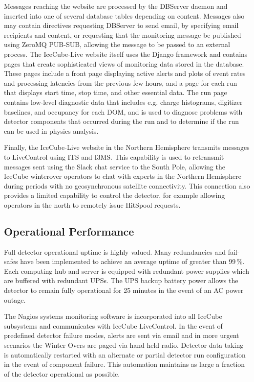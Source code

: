 Messages reaching the website are processed by the DBServer daemon and inserted into one of several database tables depending on content.
Messages also may contain directives requesting DBServer to send email, by specifying email recipients and content,
or requesting that the monitoring message be published using ZeroMQ PUB-SUB, allowing the message to be passed to an external process.  The IceCube-Live
website itself uses the Django framework and contains pages that create sophisticated views of monitoring data stored in the database.
These pages include a front page displaying active alerts and plots of event rates and processing latencies from the previous few hours, and
a page for each run that displays start time, stop time, and other essential data.  The run page contains low-level diagnostic data that
includes e.g. charge histograms, digitizer baselines, and occupancy for each DOM, and is used to diagnose problems with detector components
that occurred during the run and to determine if the run can be used in physics analysis.

Finally, the IceCube-Live website in the Northern Hemisphere transmits messages to LiveControl using ITS and I3MS.  This capability is used to retransmit
messages sent using the Slack chat service to the South Pole, allowing the IceCube winterover operators to chat with
experts in the Northern Hemisphere during periods with no geosynchronous satellite connectivity.  This connection also provides a limited
capability to control the detector, for example allowing operators in the north to remotely issue HitSpool requests.



\subsection{Operational Performance}

Full detector operational uptime is highly valued. Many redundancies and fail-safes have been implemented to achieve an average uptime of greater than 99\,\%. Each computing hub and server is equipped with redundant power supplies which are buffered with redundant UPSs. The UPS backup battery power allows the detector to remain fully operational for 25 minutes in the event of an AC power outage. 

The Nagios systems monitoring software is incorporated into all IceCube subsystems and communicates with IceCube LiveControl. In the event of predefined detector failure modes, alerts are sent via email and in more urgent scenarios the Winter Overs are paged via hand-held radio. Detector data taking is automatically restarted with an alternate or partial detector run configuration in the event of component failure.  This automation maintains as large a fraction of the detector operational as possible. 

